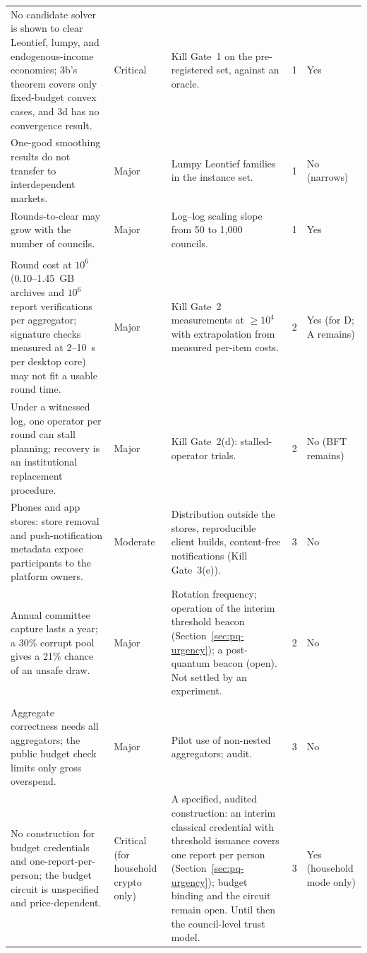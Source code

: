 \documentclass[10pt,twoside,openany]{book}
\theoremstyle{dpepstyle}
\begin{document}
{\begin{longtable}{L{1.45in} L{0.48in} L{1.55in} L{0.42in} L{0.42in}}
No candidate solver is shown to clear Leontief, lumpy, and endogenous-income economies; 3b's theorem covers only fixed-budget convex cases, and 3d has no convergence result. & Critical & Kill Gate~1 on the pre-registered set, against an oracle. & 1 & Yes \\
One-good smoothing results do not transfer to interdependent markets. & Major & Lumpy Leontief families in the instance set. & 1 & No (narrows) \\
Rounds-to-clear may grow with the number of councils. & Major & Log--log scaling slope from 50 to 1,000 councils. & 1 & Yes \\
\addlinespace[2pt]
\\
Round cost at $10^6$ (0.10--1.45~GB archives and $10^6$ report verifications per aggregator; signature checks measured at 2--10~s per desktop core) may not fit a usable round time. & Major & Kill Gate~2 measurements at $\ge 10^4$ with extrapolation from measured per-item costs. & 2 & Yes (for D; A remains) \\
Under a witnessed log, one operator per round can stall planning; recovery is an institutional replacement procedure. & Major & Kill Gate~2(d): stalled-operator trials. & 2 & No (BFT remains) \\
Phones and app stores: store removal and push-notification metadata expose participants to the platform owners. & Moderate & Distribution outside the stores, reproducible client builds, content-free notifications (Kill Gate~3(e)). & 3 & No \\
Annual committee capture lasts a year; a 30\% corrupt pool gives a 21\% chance of an unsafe draw. & Major & Rotation frequency; operation of the interim threshold beacon (Section~\ref{sec:pq-urgency}); a post-quantum beacon (open). Not settled by an experiment. & 2 & No \\
\addlinespace[2pt]
\\
Aggregate correctness needs all aggregators; the public budget check limits only gross overspend. & Major & Pilot use of non-nested aggregators; audit. & 3 & No \\
No construction for budget credentials and one-report-per-person; the budget circuit is unspecified and price-dependent. & Critical (for household crypto only) & A specified, audited construction: an interim classical credential with threshold issuance covers one report per person (Section~\ref{sec:pq-urgency}); budget binding and the circuit remain open. Until then the council-level trust model. & 3 & Yes (household mode only) \\

\end{longtable}}
\end{document}
